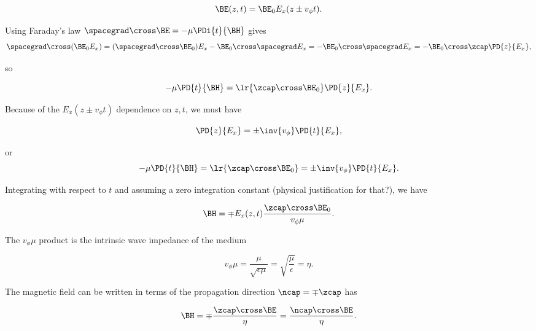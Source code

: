 \begin{equation}\label{eqn:uwavesLecture2:360}
\BE(z, t) = \BE_0 E_x( z \pm v_\phi t).
\end{equation}

Using Faraday's law \( \spacegrad \cross \BE = -\mu \PDi{t}{\BH} \) gives
\begin{dmath}\label{eqn:uwavesLecture2:380}
\spacegrad \cross (\BE_0 E_x)
=
(\spacegrad \cross \BE_0) E_x
-\BE_0 \cross \spacegrad E_x
=
-\BE_0 \cross \spacegrad E_x
=
-\BE_0 \cross \zcap \PD{z}{E_x},
\end{dmath}

so

\begin{dmath}\label{eqn:uwavesLecture2:460}
-\mu \PD{t}{\BH} =
\lr{ \zcap \cross \BE_0 } \PD{z}{E_x}.
\end{dmath}

Because of the \( E_x( z \pm v_\phi t ) \) dependence on \( z, t \), we must have

\begin{dmath}\label{eqn:uwavesLecture2:480}
\PD{z}{E_x} = \pm \inv{v_\phi} \PD{t}{E_x},
\end{dmath}

or
\begin{dmath}\label{eqn:uwavesLecture2:500}
-\mu \PD{t}{\BH} =
\lr{ \zcap \cross \BE_0 }
= \pm \inv{v_\phi} \PD{t}{E_x}.
\end{dmath}

Integrating with respect to \( t \) and assuming a zero integration constant (physical justification for that?), we have

\begin{dmath}\label{eqn:uwavesLecture2:520}
\BH = \mp E_x(z, t) \frac{\zcap \cross \BE_0}{v_\phi \mu}.
\end{dmath}

The \( v_\phi \mu \) product is the intrinsic wave impedance of the medium

\begin{dmath}\label{eqn:uwavesLecture2:540}
v_\phi \mu = \frac{\mu}{\sqrt{\epsilon\mu}} = \sqrt{\frac{\mu}{\epsilon}} = \eta.
\end{dmath}

The magnetic field can be written in terms of the propagation direction \( \ncap = \mp \zcap \) has

\begin{equation}\label{eqn:uwavesLecture2:560}
\BH
= \mp \frac{\zcap \cross \BE}{\eta}
= \frac{\ncap \cross \BE}{\eta}.
\end{equation}

